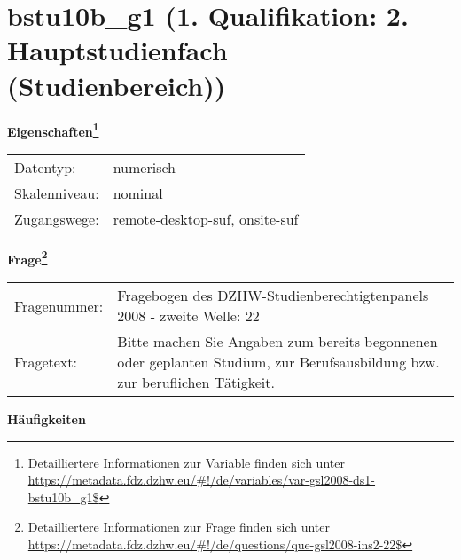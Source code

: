 
    \setcounter{footnote}{0}

    \vspace*{-1.8cm}
	\section{bstu10b\_g1 (1. Qualifikation: 2. Hauptstudienfach (Studienbereich))}
	\label{section:bstu10b_g1}



    \vspace*{0.5cm}
    \noindent\textbf{Eigenschaften\footnote{Detailliertere Informationen zur Variable finden sich unter
		\url{https://metadata.fdz.dzhw.eu/\#!/de/variables/var-gsl2008-ds1-bstu10b_g1$}}}\\
	\begin{tabularx}{\hsize}{@{}lX}
	Datentyp: & numerisch \\
	Skalenniveau: & nominal \\
	Zugangswege: &
	  remote-desktop-suf, 
	  onsite-suf
 \\
    \end{tabularx}



				\vspace*{0.5cm}
                \noindent\textbf{Frage\footnote{Detailliertere Informationen zur Frage finden sich unter
		              \url{https://metadata.fdz.dzhw.eu/\#!/de/questions/que-gsl2008-ins2-22$}}}\\
				\begin{tabularx}{\hsize}{@{}lX}
					Fragenummer: &
					  Fragebogen des DZHW-Studienberechtigtenpanels 2008 - zweite Welle:
					  22
 \\
					Fragetext: & Bitte machen Sie Angaben zum bereits begonnenen oder geplanten Studium, zur Berufsausbildung bzw. zur beruflichen Tätigkeit. \\
				\end{tabularx}





        		\vspace*{0.5cm}
                \noindent\textbf{Häufigkeiten}

